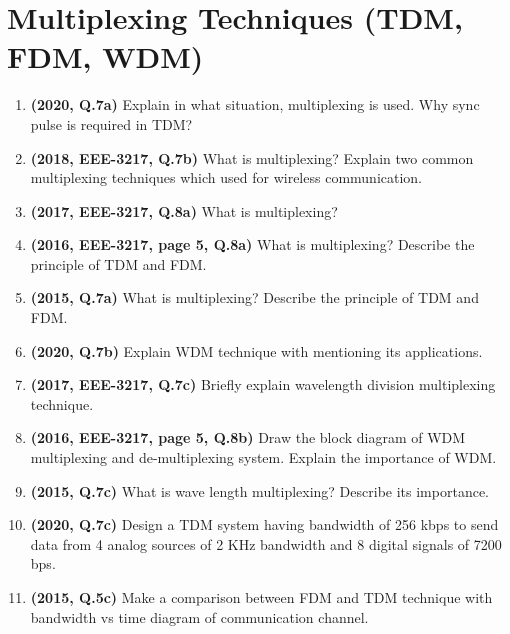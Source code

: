 \documentclass[12pt, a4paper]{article}
\begin{document}
	\section{Multiplexing Techniques (TDM, FDM, WDM)}
	\begin{enumerate}
		\item \textbf{(2020, Q.7a)} Explain in what situation, multiplexing is used. Why sync pulse is required in TDM?
		\item \textbf{(2018, EEE-3217, Q.7b)} What is multiplexing? Explain two common multiplexing techniques which used for wireless communication.
		\item \textbf{(2017, EEE-3217, Q.8a)} What is multiplexing?
		\item \textbf{(2016, EEE-3217, page 5, Q.8a)} What is multiplexing? Describe the principle of TDM and FDM.
		\item \textbf{(2015, Q.7a)} What is multiplexing? Describe the principle of TDM and FDM.
		
		\item \textbf{(2020, Q.7b)} Explain WDM technique with mentioning its applications.
		\item \textbf{(2017, EEE-3217, Q.7c)} Briefly explain wavelength division multiplexing technique.
		\item \textbf{(2016, EEE-3217, page 5, Q.8b)} Draw the block diagram of WDM multiplexing and de-multiplexing system. Explain the importance of WDM.
		\item \textbf{(2015, Q.7c)} What is wave length multiplexing? Describe its importance.
		
		\item \textbf{(2020, Q.7c)} Design a TDM system having bandwidth of 256 kbps to send data from 4 analog sources of 2 KHz bandwidth and 8 digital signals of 7200 bps.
		
		\item \textbf{(2015, Q.5c)} Make a comparison between FDM and TDM technique with bandwidth vs time diagram of communication channel.
		
	\end{enumerate}
	
\end{document}
